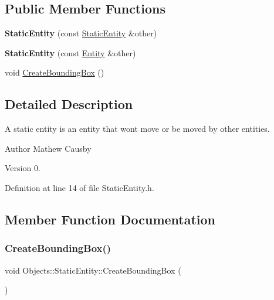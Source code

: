 \subsection*{Public Member Functions}
\begin{DoxyCompactItemize}
\item 
\mbox{\label{class_objects_1_1_static_entity_ae611b292618ebfc8fff200dbbf8080e6}} 
{\bfseries Static\+Entity} (const \hyperlink{class_objects_1_1_static_entity}{Static\+Entity} \&other)
\item 
\mbox{\label{class_objects_1_1_static_entity_a173c0997cfd7cfb323230a98a9884775}} 
{\bfseries Static\+Entity} (const \hyperlink{class_objects_1_1_entity}{Entity} \&other)
\item 
void \hyperlink{class_objects_1_1_static_entity_ae4b1ecdb50494a6d784b81803041ed52}{Create\+Bounding\+Box} ()
\end{DoxyCompactItemize}


\subsection{Detailed Description}
A static entity is an entity that won\textquotesingle{}t move or be moved by other entities. \begin{DoxyAuthor}{Author}
Mathew Causby 
\end{DoxyAuthor}
\begin{DoxyVersion}{Version}
0. 
\end{DoxyVersion}


Definition at line 14 of file Static\+Entity.\+h.



\subsection{Member Function Documentation}
\mbox{\label{class_objects_1_1_static_entity_ae4b1ecdb50494a6d784b81803041ed52}} 
\subsubsection{\texorpdfstring{Create\+Bounding\+Box()}{CreateBoundingBox()}}
{\footnotesize\ttfamily void Objects\+::\+Static\+Entity\+::\+Create\+Bounding\+Box (\begin{DoxyParamCaption}{ }\end{DoxyParamCaption})\hspace{0.3cm}{\ttfamily [virtual]}}

